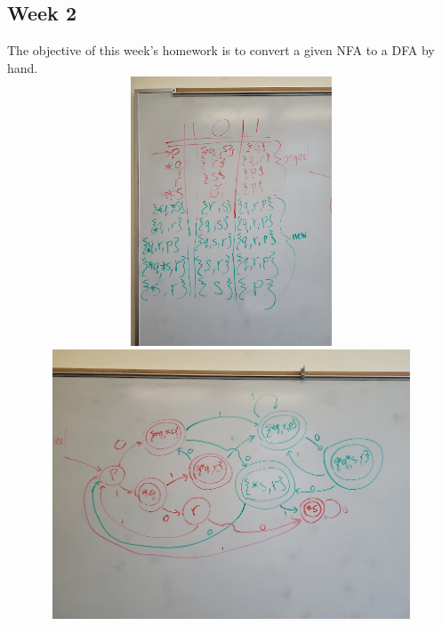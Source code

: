 \documentclass{article}
\theoremstyle{theorem}
\theoremstyle{definition}
\theoremstyle{remark}
\begin{document}
\subsection{Week 2}
The objective of this week's homework is to convert a given NFA to a DFA by hand.
\\ \includegraphics[width=15cm, height=8cm]{Report Images/HW2_1.jpg}
\\ \includegraphics[width=15cm, height=8cm]{Report Images/HW2_2.jpg}
\end{document}
